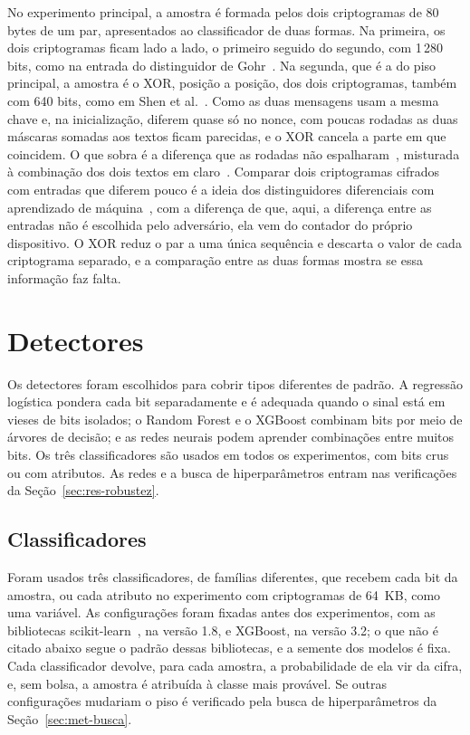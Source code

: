 No experimento principal, a amostra é formada pelos dois criptogramas de 80 bytes de um par, apresentados ao classificador de duas formas. Na primeira, os dois criptogramas ficam lado a lado, o primeiro seguido do segundo, com 1\,280 bits, como na entrada do distinguidor de Gohr~\cite{gohr_2019}. Na segunda, que é a do piso principal, a amostra é o XOR, posição a posição, dos dois criptogramas, também com 640 bits, como em Shen et al.~\cite{Shen2024ND}. Como as duas mensagens usam a mesma chave e, na inicialização, diferem quase só no nonce, com poucas rodadas as duas máscaras somadas aos textos ficam parecidas, e o XOR cancela a parte em que coincidem. O que sobra é a diferença que as rodadas não espalharam~\cite{BihamShamir1991}, misturada à combinação dos dois textos em claro~\cite{Mason2006TwoTimePad}. Comparar dois criptogramas cifrados com entradas que diferem pouco é a ideia dos distinguidores diferenciais com aprendizado de máquina~\cite{gohr_2019,benamira_2021}, com a diferença de que, aqui, a diferença entre as entradas não é escolhida pelo adversário, ela vem do contador do próprio dispositivo. O XOR reduz o par a uma única sequência e descarta o valor de cada criptograma separado, e a comparação entre as duas formas mostra se essa informação faz falta.

\section{Detectores}
\label{sec:met-detectores}

Os detectores foram escolhidos para cobrir tipos diferentes de padrão. A regressão logística pondera cada bit separadamente e é adequada quando o sinal está em vieses de bits isolados; o Random Forest e o XGBoost combinam bits por meio de árvores de decisão; e as redes neurais podem aprender combinações entre muitos bits. Os três classificadores são usados em todos os experimentos, com bits crus ou com atributos. As redes e a busca de hiperparâmetros entram nas verificações da Seção~\ref{sec:res-robustez}.

\subsection{Classificadores}
\label{sec:met-classificadores}

Foram usados três classificadores, de famílias diferentes, que recebem cada bit da amostra, ou cada atributo no experimento com criptogramas de 64~KB, como uma variável. As configurações foram fixadas antes dos experimentos, com as bibliotecas scikit-learn~\cite{Pedregosa2011}, na versão 1.8, e XGBoost, na versão 3.2; o que não é citado abaixo segue o padrão dessas bibliotecas, e a semente dos modelos é fixa. Cada classificador devolve, para cada amostra, a probabilidade de ela vir da cifra, e, sem bolsa, a amostra é atribuída à classe mais provável. Se outras configurações mudariam o piso é verificado pela busca de hiperparâmetros da Seção~\ref{sec:met-busca}.

